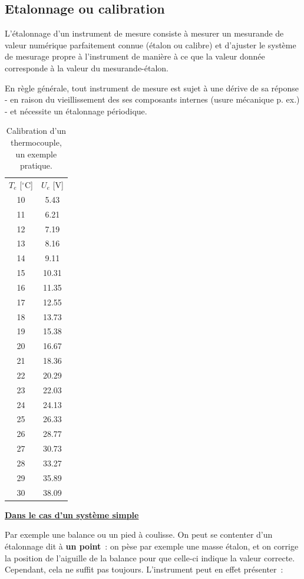 \subsection{Etalonnage ou calibration}

L'étalonnage d'un instrument de mesure consiste à mesurer un mesurande de valeur numérique parfaitement connue (étalon ou calibre) et d'ajuster le système de mesurage propre à l'instrument de manière à ce que la valeur donnée corresponde à la valeur du mesurande-étalon.

En règle générale, tout instrument de mesure est sujet à une dérive de sa réponse - en raison du vieillissement des ses composants internes (usure mécanique p. ex.) -  et nécessite un étalonnage périodique.

\begin{table}
\vspace{-1.5cm}
\caption{Calibration d'un thermocouple, un exemple pratique.}
\begin{center}
\begin{tabular}{c|c}
$T_e$ [$^\circ$C] & $U_e$ [V] \\
10 &  5.43 \\
11 &  6.21 \\
12 &  7.19 \\
13 &  8.16 \\
14 &  9.11 \\
15 & 10.31 \\
16 & 11.35 \\
17 & 12.55 \\
18 & 13.73 \\
19 & 15.38 \\
20 & 16.67 \\
21 & 18.36 \\
22 & 20.29 \\
23 & 22.03 \\
24 & 24.13 \\
25 & 26.33 \\
26 & 28.77 \\
27 & 30.73 \\
28 & 33.27 \\
29 & 35.89 \\
30 & 38.09
\end{tabular}
\end{center}
\label{tab:tc}
\end{table}

\begin{flushleft}
\underline{\textbf{Dans le cas d'un système simple}}
\end{flushleft}
Par exemple une balance ou un pied à coulisse. On peut se contenter d'un étalonnage dit à \textbf{un point}~: on pèse par exemple une masse étalon, et on corrige la position de l'aiguille de la balance pour que celle-ci indique la valeur correcte. Cependant, cela ne suffit pas toujours. L'instrument peut en effet présenter~:
